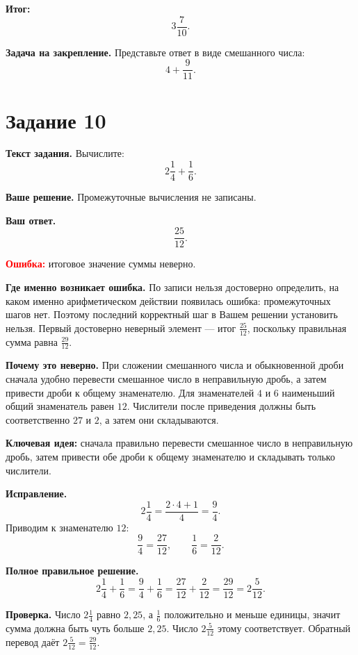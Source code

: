 \documentclass[12pt,a4paper]{article}
\begin{document}
\textcolor{teal!60!black}{\textbf{Итог:}}
\[
\boxed{3\frac{7}{10}}.
\]

\textbf{Задача на закрепление.}
Представьте ответ в виде смешанного числа:
\[
4+\frac{9}{11}.
\]

\newpage
{}\label{task:10}
\section*{Задание 10}

\textbf{Текст задания.}
Вычислите:
\[
2\frac{1}{4}+\frac{1}{6}.
\]

\textbf{Ваше решение.}
Промежуточные вычисления не записаны.

\textbf{Ваш ответ.}
\[
\frac{25}{12}.
\]

\textcolor{red}{\textbf{Ошибка:}} итоговое значение суммы неверно.

\textbf{Где именно возникает ошибка.}
По записи нельзя достоверно определить, на каком именно арифметическом действии появилась ошибка: промежуточных шагов нет. Поэтому последний корректный шаг в Вашем решении установить нельзя. Первый достоверно неверный элемент --- итог $\frac{25}{12}$, поскольку правильная сумма равна $\frac{29}{12}$.

\textbf{Почему это неверно.}
При сложении смешанного числа и обыкновенной дроби сначала удобно перевести смешанное число в неправильную дробь, а затем привести дроби к общему знаменателю. Для знаменателей $4$ и $6$ наименьший общий знаменатель равен $12$. Числители после приведения должны быть соответственно $27$ и $2$, а затем они складываются.

\textcolor{blue!60!black}{\textbf{Ключевая идея:}} сначала правильно перевести смешанное число в неправильную дробь, затем привести обе дроби к общему знаменателю и складывать только числители.

\textbf{Исправление.}
\[
2\frac{1}{4}=\frac{2\cdot4+1}{4}=\frac{9}{4}.
\]
Приводим к знаменателю $12$:
\[
\frac{9}{4}=\frac{27}{12},\qquad \frac{1}{6}=\frac{2}{12}.
\]

\textbf{Полное правильное решение.}
\[
2\frac{1}{4}+\frac{1}{6}
=\frac{9}{4}+\frac{1}{6}
=\frac{27}{12}+\frac{2}{12}
=\frac{29}{12}
=2\frac{5}{12}.
\]

\textbf{Проверка.}
Число $2\frac{1}{4}$ равно $2{,}25$, а $\frac16$ положительно и меньше единицы, значит сумма должна быть чуть больше $2{,}25$. Число $2\frac{5}{12}$ этому соответствует. Обратный перевод даёт $2\frac{5}{12}=\frac{29}{12}$.
\end{document}
